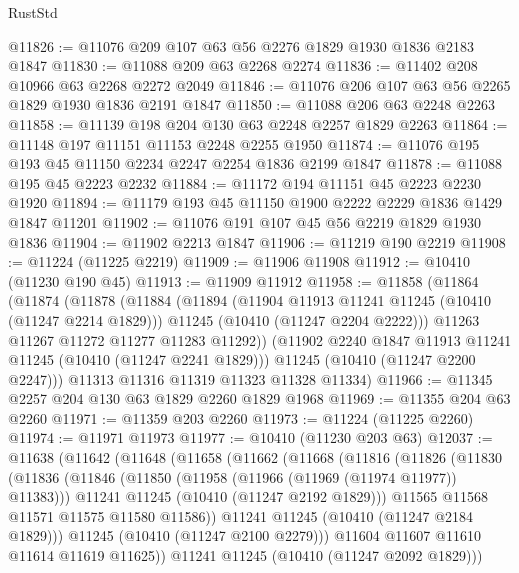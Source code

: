 \begin{lexlean}{RustStd}
\begin{coremodule}
@11826 := @11076 @209 @107 @63 @56 @2276 @1829 @1930 @1836 @2183 @1847
@11830 := @11088 @209 @63 @2268 @2274
@11836 := @11402 @208 @10966 @63 @2268 @2272 @2049
@11846 := @11076 @206 @107 @63 @56 @2265 @1829 @1930 @1836 @2191 @1847
@11850 := @11088 @206 @63 @2248 @2263
@11858 := @11139 @198 @204 @130 @63 @2248 @2257 @1829 @2263
@11864 := @11148 @197 @11151 @11153 @2248 @2255 @1950
@11874 := @11076 @195 @193 @45 @11150 @2234 @2247 @2254 @1836 @2199 @1847
@11878 := @11088 @195 @45 @2223 @2232
@11884 := @11172 @194 @11151 @45 @2223 @2230 @1920
@11894 := @11179 @193 @45 @11150 @1900 @2222 @2229 @1836 @1429 @1847 @11201
@11902 := @11076 @191 @107 @45 @56 @2219 @1829 @1930 @1836
@11904 := @11902 @2213 @1847
@11906 := @11219 @190 @2219
@11908 := @11224 (@11225 @2219)
@11909 := @11906 @11908
@11912 := @10410 (@11230 @190 @45)
@11913 := @11909 @11912
@11958 := @11858
    (@11864
      (@11874
        (@11878
          (@11884
            (@11894
              (@11904 @11913 @11241 @11245 (@10410 (@11247 @2214 @1829)))
              @11245
              (@10410 (@11247 @2204 @2222)))
            @11263
            @11267
            @11272
            @11277
            @11283
            @11292))
        (@11902 @2240 @1847 @11913 @11241 @11245 (@10410 (@11247 @2241 @1829)))
        @11245
        (@10410 (@11247 @2200 @2247)))
      @11313
      @11316
      @11319
      @11323
      @11328
      @11334)
@11966 := @11345 @2257 @204 @130 @63 @1829 @2260 @1829 @1968
@11969 := @11355 @204 @63 @2260
@11971 := @11359 @203 @2260
@11973 := @11224 (@11225 @2260)
@11974 := @11971 @11973
@11977 := @10410 (@11230 @203 @63)
@12037 := @11638
    (@11642
      (@11648
        (@11658
          (@11662
            (@11668
              (@11816
                (@11826
                  (@11830
                    (@11836
                      (@11846
                        (@11850 (@11958 (@11966 (@11969 (@11974 @11977)) @11383)))
                        @11241
                        @11245
                        (@10410 (@11247 @2192 @1829)))
                      @11565
                      @11568
                      @11571
                      @11575
                      @11580
                      @11586))
                  @11241
                  @11245
                  (@10410 (@11247 @2184 @1829)))
                @11245
                (@10410 (@11247 @2100 @2279)))
              @11604
              @11607
              @11610
              @11614
              @11619
              @11625))
          @11241
          @11245
          (@10410 (@11247 @2092 @1829)))

\end{coremodule}
\end{lexlean}
